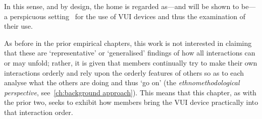\begin{revisedsubmission}{
In this sense, and by design, the home is regarded as---and will be shown to be---a perspicuous setting~\citep[p. 181]{Garfinkel2002} for the use of \ac{VUI} devices and thus the examination of their use.}



As before in the prior empirical chapters, this work is not interested in claiming that these are `representative' or `generalised' findings of how all interactions can or may unfold; rather, it is given that members continually try to make their own interactions orderly and rely upon the orderly features of others so as to each analyse what the others are doing and thus `go on' (the \textit{ethnomethodological perspective}, see~\autoref{ch:background approach}).
This means that this chapter, as with the prior two, seeks to exhibit how members bring the \ac{VUI} device practically into that interaction order.
\end{revisedsubmission}






